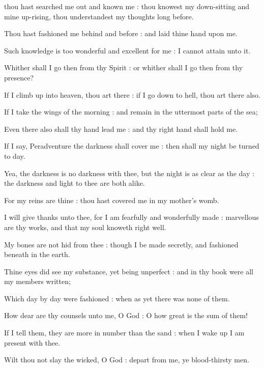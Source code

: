 thou hast searched me out and known me : thou knowest my down-sitting and mine up-rising, thou understandest my thoughts long before.\par
{}
Thou hast fashioned me behind and before : and laid thine hand upon me.\par
{}Such knowledge is too wonderful and excellent for me : I cannot attain unto it.\par
{}Whither shall I go then from thy Spirit : or whither shall I go then from thy presence?\par
{}If I climb up into heaven, thou art there : if I go down to hell, thou art there also.\par
{}If I take the wings of the morning : and remain in the uttermost parts of the sea;\par
{}Even there also shall thy hand lead me : and thy right hand shall hold me.\par
{}If I say, Peradventure the darkness shall cover me : then shall my night be turned to day.\par
{}Yea, the darkness is no darkness with thee, but the night is as clear as the day : the darkness and light to thee are both alike.\par
{}For my reins are thine : thou hast covered me in my mother's womb.\par
{}I will give thanks unto thee, for I am fearfully and wonderfully made : marvellous are thy works, and that my soul knoweth right well.\par
{}My bones are not hid from thee : though I be made secretly, and fashioned beneath in the earth.\par
{}Thine eyes did see my substance, yet being unperfect : and in thy book were all my members written;\par
{}Which day by day were fashioned : when as yet there was none of them.\par
{}How dear are thy counsels unto me, O God : O how great is the sum of them!\par
{}If I tell them, they are more in number than the sand : when I wake up I am present with thee.\par
{}Wilt thou not slay the wicked, O God : depart from me, ye blood-thirsty men.\par
